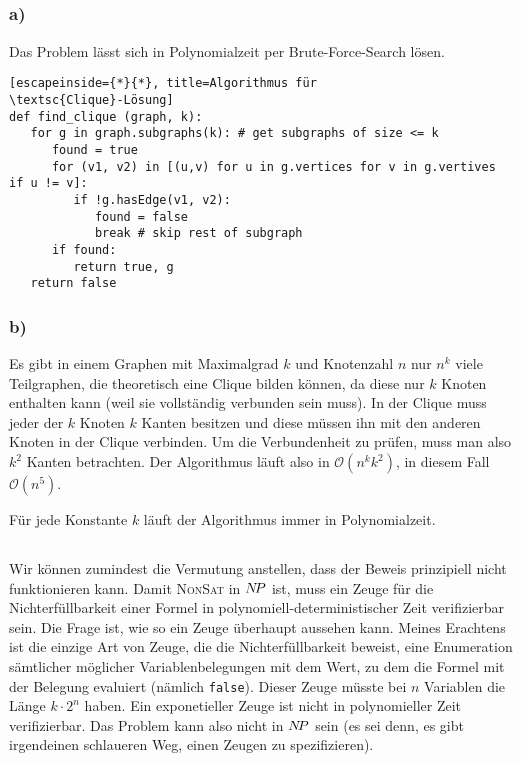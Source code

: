 \documentclass{article}
\begin{document}
\subsection{} 

\subsubsection{a)}


Das Problem lässt sich in Polynomialzeit per Brute-Force-Search lösen.
\begin{lstlisting}[escapeinside={*}{*}, title=Algorithmus für
\textsc{Clique}-Lösung]
def find_clique (graph, k):
   for g in graph.subgraphs(k): # get subgraphs of size <= k
      found = true
      for (v1, v2) in [(u,v) for u in g.vertices for v in g.vertives if u != v]:
         if !g.hasEdge(v1, v2):
            found = false
            break # skip rest of subgraph
      if found:
         return true, g
   return false
\end{lstlisting}

\subsubsection{b)}

Es gibt in einem Graphen mit Maximalgrad $k$ und Knotenzahl $n$ nur $n^k$ viele
Teilgraphen, die theoretisch eine Clique bilden können, da diese nur $k$ Knoten
enthalten kann (weil sie vollständig verbunden sein muss). In der Clique muss
jeder der $k$ Knoten $k$ Kanten besitzen und diese müssen ihn mit den anderen
Knoten in der Clique verbinden. Um die Verbundenheit zu prüfen, muss man also
$k^2$ Kanten betrachten. Der Algorithmus läuft also in
$\mathcal{O}\left(n^k k^2\right)$, in diesem Fall $\mathcal{O}\left(n^5\right)$.

Für jede Konstante $k$ läuft der Algorithmus immer in Polynomialzeit.

\subsection{} 

Wir können zumindest die Vermutung anstellen, dass der Beweis prinzipiell nicht
funktionieren kann. Damit \textsc{NonSat} in $N\kern-2ptP$ ist, muss ein Zeuge für die
Nichterfüllbarkeit einer Formel in polynomiell-deterministischer Zeit
verifizierbar sein. Die Frage ist, wie so ein Zeuge überhaupt aussehen kann.
Meines Erachtens ist die einzige Art von Zeuge, die die Nichterfüllbarkeit
beweist, eine Enumeration sämtlicher möglicher Variablenbelegungen mit dem Wert,
zu dem die Formel mit der Belegung evaluiert (nämlich \texttt{false}). Dieser Zeuge müsste bei $n$
Variablen die Länge $k\cdot2^n$ haben. Ein exponetieller Zeuge ist nicht in
polynomieller Zeit verifizierbar. Das Problem kann also nicht in $N\kern-2ptP$ sein (es
sei denn, es gibt irgendeinen schlaueren Weg, einen Zeugen zu spezifizieren).
\end{document}
